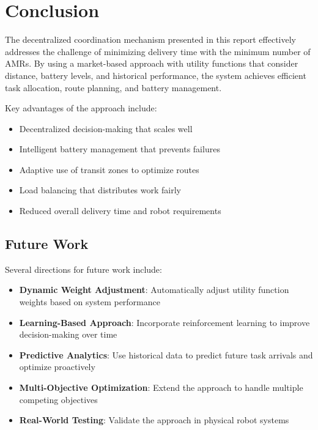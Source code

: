 \documentclass[12pt,a4paper]{article}
\begin{document}
\section{Conclusion}

The decentralized coordination mechanism presented in this report effectively addresses the challenge of minimizing delivery time with the minimum number of AMRs. By using a market-based approach with utility functions that consider distance, battery levels, and historical performance, the system achieves efficient task allocation, route planning, and battery management.

Key advantages of the approach include:

\begin{itemize}
    \item Decentralized decision-making that scales well
    \item Intelligent battery management that prevents failures
    \item Adaptive use of transit zones to optimize routes
    \item Load balancing that distributes work fairly
    \item Reduced overall delivery time and robot requirements
\end{itemize}

\subsection{Future Work}

Several directions for future work include:

\begin{itemize}
    \item \textbf{Dynamic Weight Adjustment}: Automatically adjust utility function weights based on system performance
    \item \textbf{Learning-Based Approach}: Incorporate reinforcement learning to improve decision-making over time
    \item \textbf{Predictive Analytics}: Use historical data to predict future task arrivals and optimize proactively
    \item \textbf{Multi-Objective Optimization}: Extend the approach to handle multiple competing objectives
    \item \textbf{Real-World Testing}: Validate the approach in physical robot systems
\end{itemize}
\end{document}
